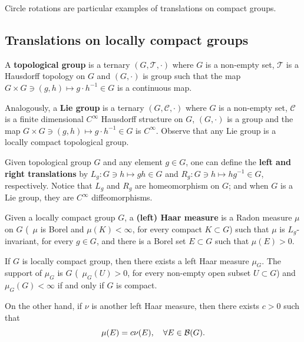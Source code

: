 Circle rotations are particular examples of translations on compact groups.

\subsection{Translations on locally compact groups}\label{sec:transl-locally-compact-groups}

A \textbf{topological group} is a ternary $(G,\mathscr{T},\cdot)$ where $G$ is a non-empty set, $\mathscr{T}$ is a Hausdorff topology on $G$ and $(G,\cdot)$ is group such that the map $G\times G\ni (g,h)\mapsto g\cdot h^{-1}\in G$ is a continuous map.

Analogously, a \textbf{Lie group} is a ternary $(G,\mathscr{C},\cdot)$ where $G$ is a non-empty set, $\mathscr{C}$ is a finite dimensional $C^{\infty}$ Hausdorff structure on $G$, $(G,\cdot)$ is a group and the map $G\times G\ni (g,h)\mapsto g\cdot h^{-1}\in G$ is $C^{\infty}$. Observe that any Lie group is a locally compact topological group.

Given topological group $G$ and any element $g\in G$, one can define the \textbf{left and right translations} by $L_{g}\colon G\ni h\mapsto gh\in G$ and $R_{g}\colon G\ni h\mapsto hg^{-1}\in G$, respectively. Notice that $L_{g}$ and $R_{g}$ are homeomorphism on $G$; and when $G$ is a Lie group, they are $C^{\infty}$ diffeomorphisms.

\begin{definition}
  Given a locally compact group $G$, a \textbf{(left) Haar measure} is a Radon measure $\mu$ on $G$ (\ie~$\mu$ is Borel and $\mu(K)<\infty$, for every compact $K\subset G$) such that $\mu$ is $L_{g}$-invariant, for every $g\in G$, and there is a Borel set $E\subset G$ such that $\mu(E)>0$.
\end{definition}

\begin{theorem}\label{thm:Haar-measures}
  If $G$ is locally compact group, then there exists a left Haar measure $\mu_{G}$. The support of $\mu_{G}$ is $G$ (\ie~$\mu_{G}(U)>0$, for every non-empty open subset $U\subset G$) and $\mu_{G}(G)<\infty$ if and only if $G$ is compact.

  On the other hand, if $\nu$ is another left Haar measure, then there exists $c>0$ such that
  \begin{displaymath}
    \mu(E)=c\nu(E), \quad\forall E\in\mathcal{B}(G).
  \end{displaymath}
\end{theorem}

